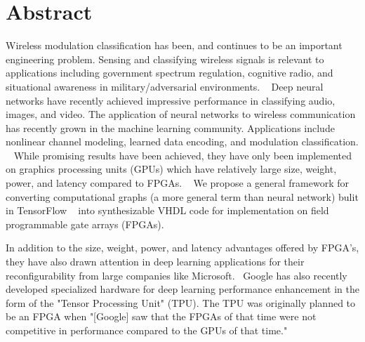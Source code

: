 \section{Abstract}
Wireless modulation classification has been, and continues to be an important engineering problem.  
Sensing and classifying wireless signals is relevant to applications including government spectrum regulation, cognitive radio, and situational awareness in military/adversarial environments.  ~\cite{DBLP:journals/corr/RajendranCFBCGP17}  Deep neural networks have recently achieved impressive performance in classifying audio, images, and video.  The application of neural networks to wireless communication has recently grown in the machine learning community.  Applications include nonlinear channel modeling, learned data encoding, and modulation classification.  ~\cite{DBLP:journals/corr/OSheaH17}  While promising results have been achieved, they have only been implemented on graphics processing units (GPUs) which have relatively large size, weight, power, and latency compared to FPGAs. ~\cite{Nurvitadhi:2017:FBG:3020078.3021740} We propose a general framework for converting computational graphs (a more general term than neural network) bulit in TensorFlow ~\cite{DBLP:journals/corr/AbadiABBCCCDDDG16} into synthesizable VHDL code for implementation on field programmable gate arrays (FPGAs).

In addition to the size, weight, power, and latency advantages offered by FPGA's, they have also drawn attention in deep learning applications for their reconfigurability from large companies like Microsoft.~\cite{Putnam:2014:RFA:2665671.2665678} Google has also recently developed specialized hardware for deep learning performance enhancement in the form of the "Tensor Processing Unit" (TPU).  The TPU was originally planned to be an FPGA when "[Google] saw that the FPGAs of that time were not competitive in performance compared to the GPUs of that time."~\cite{DBLP:journals/corr/JouppiYPPABBBBB17}  
